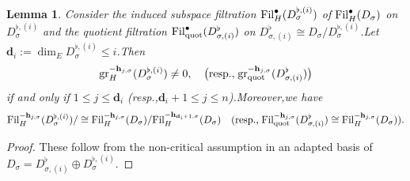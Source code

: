 \documentclass[10pt]{article}
\newtheorem{lem}[thm]{Lemma}
\newcommand{\fil}{{\rm Fil}}
\newcommand{\gr}{{\rm gr}}
\newcommand{\bh}{{\mathbf{h}}}
\newcommand{\bd}{{\mathbf{d}}}
\begin{document}
\begin{lem}\label{hodgegapforquofil}
	Consider the induced subspace filtration $\fil_H^{\bullet}(D_{\sigma}^{\flat,(i)})$ of $\fil_H^{\bullet}(D_{\sigma})$ on $D_{\sigma}^{\flat,(i)}$ and the quotient filtration $\fil_{\mathrm{quot}}^{\bullet}(D^{\flat}_{\sigma,(i)})$ on $D^{\flat}_{\sigma,(i)}\cong D_{\sigma}/D_{\sigma}^{\flat,(i)}$.\;Let  $\bd_i:=\dim_ED_{\sigma}^{\flat,(i)}\leq i$.\;Then
	\begin{equation}
	\begin{aligned}
		\gr_H^{-\bh_{j,\sigma}}(D_{\sigma}^{\flat,(i)})\neq 0,\quad \big(\text{resp.,\;}\gr_{\mathrm{quot}}^{-\bh_{j,\sigma}}(D^{\flat}_{\sigma,(i)})\big)
	\end{aligned}
	\end{equation}
	if and only if $1\leq j\leq \bd_i$ (resp.,\;$\bd_i+1\leq j\leq n$).\;Moreover,\;we have
		\begin{equation}\label{comparefilwithflat}
		\begin{aligned}
			\fil_H^{-\bh_{j,\sigma}}(D_{\sigma}^{\flat,(i)})/\cong \fil_H^{-\bh_{j,\sigma}}(D_{\sigma})/\fil_H^{-\bh_{\bd_i+1,\sigma}}(D_{\sigma})\quad (\text{resp.,\;}\fil_{\mathrm{quot}}^{-\bh_{j,\sigma}}(D^{\flat}_{\sigma,(i)})\cong\fil_H^{-\bh_{j,\sigma}}(D_{\sigma})).
		\end{aligned}
	\end{equation}
\end{lem}
\begin{proof}
	These follow from the non-critical assumption in an adapted basis of $D_{\sigma}=D^{\flat}_{\sigma,(i)}\oplus D_{\sigma}^{\flat,(i)} $.\;
\end{proof}
\end{document}
